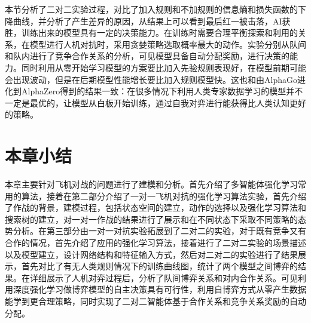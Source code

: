 本节分析了二对二实验过程，对比了加入规则和不加规则的信息熵和损失函数的下降曲线，并分析了产生差异的原因，从结果上可以看到最后红一被击落，AI获胜，训练出来的模型具有一定的决策能力。在训练时需要合理平衡探索和利用的关系，在模型进行人机对抗时，采用贪婪策略选取概率最大的动作。实验分别从队间和队内进行了竞争合作关系的分析，可见模型具备自动分配奖励，进行决策的能力。同时利用从零开始学习模型的方案要比加入先验规则表现好，在模型前期可能会出现波动，但是在后期模型性能增长要比加入规则模型快。这也和由AlphaGo进化到AlphaZero得到的结果一致：在很多情况下利用人类专家数据学习的模型并不一定是最优的，让模型从白板开始训练，通过自我对弈进行能获得比人类认知更好的策略。

\section{本章小结}
本章主要针对飞机对战的问题进行了建模和分析。首先介绍了多智能体强化学习常用的算法，接着在第二部分介绍了一对一飞机对抗的强化学习算法实验，首先介绍了作战的背景，建模过程，包括状态空间的建立，动作的选择以及强化学习算法和搜索树的建立，对一对一作战的结果进行了展示和在不同状态下采取不同策略的态势分析。在第三部分由一对一对抗实验拓展到了二对二的实验，对于既有竞争又有合作的情况，首先介绍了应用的强化学习算法，接着进行了二对二实验的场景描述以及模型建立，设计网络结构和特征输入方式，然后对二对二的实验进行了结果展示，首先对比了有无人类规则情况下的训练曲线图，统计了两个模型之间博弈的结果。在详细展示了人机对弈过程后，分析了队间博弈关系和对内合作关系。可见利用深度强化学习做博弈模型的自主决策具有可行性，利用自博弈方式从零产生数据能学到更合理策略，同时实现了二对二智能体基于合作关系和竞争关系奖励的自动分配。

